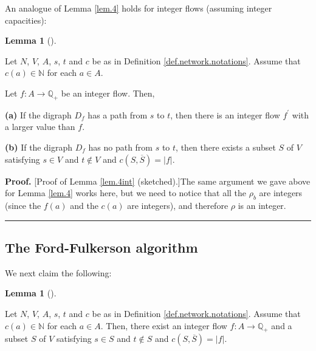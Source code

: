\documentclass[numbers=enddot,12pt,final,onecolumn,notitlepage]{scrartcl}%
\theoremstyle{definition}
\newtheorem{lem}[theo]{Lemma}
\newenvironment{lemma}[1][]
{\begin{lem}[#1]\begin{leftbar}}
{\end{leftbar}\end{lem}}
\newenvironment{proof}[1][Proof]{\noindent\textbf{#1.} }{\ \rule{0.5em}{0.5em}}
\begin{document}
An analogue of Lemma \ref{lem.4} holds for integer flows (assuming integer capacities):

\begin{lemma}
\label{lem.4int}Let $N$, $V$, $A$, $s$, $t$ and $c$ be as in Definition
\ref{def.network.notations}. Assume that $c\left(  a\right)  \in\mathbb{N}$
for each $a\in A$.

Let $f:A\rightarrow\mathbb{Q}_{+}$ be an integer flow. Then,

\textbf{(a)} If the digraph $D_{f}$ has a path from $s$ to $t$, then there is
an integer flow $f^{\prime}$ with a larger value than $f$.

\textbf{(b)} If the digraph $D_{f}$ has no path from $s$ to $t$, then there
exists a subset $S$ of $V$ satisfying $s\in V$ and $t\notin V$ and $c\left(
S,\overline{S}\right)  =\left\vert f\right\vert $.
\end{lemma}

\begin{proof}
[Proof of Lemma \ref{lem.4int} (sketched).]The same argument we gave above for
Lemma \ref{lem.4} works here, but we need to notice that all the $\rho_{b}$
are integers (since the $f\left(  a\right)  $ and the $c\left(  a\right)  $
are integers), and therefore $\rho$ is an integer.
\end{proof}

\subsection{The Ford-Fulkerson algorithm}

We next claim the following:

\begin{lemma}
\label{lem.3bat}Let $N$, $V$, $A$, $s$, $t$ and $c$ be as in Definition
\ref{def.network.notations}. Assume that $c\left(  a\right)  \in\mathbb{N}$
for each $a\in A$. Then, there exist an integer flow $f:A\rightarrow
\mathbb{Q}_{+}$ and a subset $S$ of $V$ satisfying $s\in S$ and $t\notin S$
and $c\left(  S,\overline{S}\right)  =\left\vert f\right\vert $.
\end{lemma}
\end{document}
